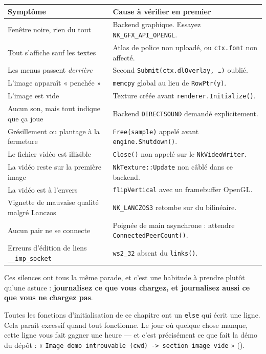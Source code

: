 \begin{center}
\begin{tabular}{@{}p{5.4cm}p{8.4cm}@{}}
\toprule
\textbf{Symptôme} & \textbf{Cause à vérifier en premier} \\
\midrule
Fenêtre noire, rien du tout &
Backend graphique. Essayez \texttt{NK\_GFX\_API\_OPENGL}. \\
Tout s'affiche sauf les textes &
Atlas de police non uploadé, ou \texttt{ctx.font} non affecté. \\
Les menus passent \emph{derrière} &
Second \texttt{Submit(ctx.dlOverlay, \dots)} oublié. \\
L'image apparaît « penchée » &
\texttt{memcpy} global au lieu de \texttt{RowPtr(y)}. \\
L'image est vide &
Texture créée avant \texttt{renderer.Initialize()}. \\
Aucun son, mais tout indique que ça joue &
Backend \texttt{DIRECTSOUND} demandé explicitement. \\
Grésillement ou plantage à la fermeture &
\texttt{Free(sample)} appelé avant \texttt{engine.Shutdown()}. \\
Le fichier vidéo est illisible &
\texttt{Close()} non appelé sur le \texttt{NkVideoWriter}. \\
La vidéo reste sur la première image &
\texttt{NkTexture::Update} non câblé dans ce backend. \\
La vidéo est à l'envers &
\texttt{flipVertical} avec un framebuffer OpenGL. \\
Vignette de mauvaise qualité malgré Lanczos &
\texttt{NK\_LANCZOS3} retombe sur du bilinéaire. \\
Aucun pair ne se connecte &
Poignée de main asynchrone : attendre \texttt{ConnectedPeerCount()}. \\
Erreurs d'édition de liens \texttt{\_\_imp\_socket} &
\texttt{ws2\_32} absent du \texttt{links()}. \\
\bottomrule
\end{tabular}
\end{center}

\begin{nkretenir}
Ces silences ont tous la même parade, et c'est une habitude à prendre plutôt
qu'une astuce : \textbf{journalisez ce que vous chargez, et journalisez aussi ce
que vous ne chargez pas}.

Toutes les fonctions d'initialisation de ce chapitre ont un \texttt{else} qui
écrit une ligne. Cela paraît excessif quand tout fonctionne. Le jour où quelque
chose manque, cette ligne vous fait gagner une heure — et c'est précisément ce
que fait la démo du dépôt : « \texttt{Image demo introuvable (cwd) -> section
image vide} »
().
\end{nkretenir}

